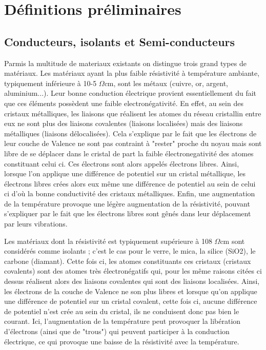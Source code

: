 \documentclass[10pt,a4paper]{report}
\begin{document}
\chapter{Définitions préliminaires}
\section{Conducteurs, isolants et Semi-conducteurs}
Parmis la multitude de materiaux existants  on distingue trois grand types de matériaux.
Les  matériaux  ayant  la  plus  faible  résistivité  à  température  ambiante,  typiquement inférieure  à  10-5  $\Omega$cm,  sont  les  métaux  (cuivre,  or,  argent,  aluminium...). Leur bonne  conduction électrique provient essentiellement du fait que ces éléments possèdent une faible electronégativité. En effet, au sein des cristaux métalliques, les liaisons que réalisent les atomes du réseau cristallin entre eux ne sont plus des liaisons covalentes (liaisons localisées) mais des liaisons métalliques (liaisons délocalisées). Cela s'explique par le fait que les électrons de leur couche de Valence ne sont pas contraint à "rester" proche du noyau mais sont libre de se déplacer dans le cristal de part la faible électronegativité des atomes constituant celui ci. Ces électrons sont alors appelés électrons libres. Ainsi, lorsque l'on applique une différence de potentiel sur un cristal métallique, les électrons libres crées alors eux même une différence de potentiel au sein de celui ci d'où la bonne conductivité des cristaux métalliques. Enfin, une augmentation de  la
température provoque une légère augmentation de la résistivité, pouvant s’expliquer par le fait que les électrons libres sont gênés dans leur déplacement par leurs vibrations.

 Les  matériaux  dont  la  résistivité  est  typiquement  supérieure  à  108  $\Omega$cm  sont  considérés comme isolants ; c’est le cas pour le verre, le mica, la silice (SiO2), le carbone (diamant). Cette fois ci, les atomes constituants ces cristaux (cristaux covalents) sont des atomes très électronégatifs qui, pour les même raisons citées ci dessus réalisent alors  des liaisons covalentes qui sont des liaisons localisées. Ainsi, les électrons de la couche de Valence ne son plus libres et lorsque qu'on applique une différence de potentiel sur un cristal covalent, cette fois ci, aucune différence de potentiel n'est crée au sein du cristal, ils ne conduisent donc pas bien le courant. Ici, l’augmentation  de  la  température  peut  provoquer  la  libération  d’électrons  (ainsi  que  de "trous")  qui  peuvent  participer  à  la  conduction  électrique,  ce  qui  provoque  une  baisse  de  la résistivité avec la température.
\end{document}

